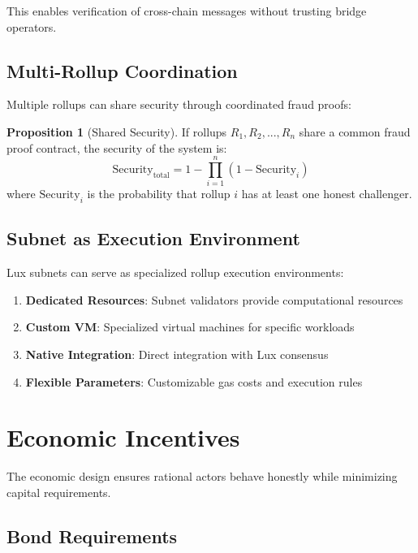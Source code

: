 \documentclass[11pt,a4paper]{article}
\theoremstyle{definition}
\newtheorem{proposition}{Proposition}[section]
\begin{document}
This enables verification of cross-chain messages without trusting bridge operators.

\subsection{Multi-Rollup Coordination}

Multiple rollups can share security through coordinated fraud proofs:

\begin{proposition}[Shared Security]
If rollups $R_1, R_2, ..., R_n$ share a common fraud proof contract, the security of the system is:
\begin{equation}
\text{Security}_{\text{total}} = 1 - \prod_{i=1}^{n}(1 - \text{Security}_i)
\end{equation}
where $\text{Security}_i$ is the probability that rollup $i$ has at least one honest challenger.
\end{proposition}

\subsection{Subnet as Execution Environment}

Lux subnets can serve as specialized rollup execution environments:

\begin{enumerate}
    \item \textbf{Dedicated Resources}: Subnet validators provide computational resources
    \item \textbf{Custom VM}: Specialized virtual machines for specific workloads
    \item \textbf{Native Integration}: Direct integration with Lux consensus
    \item \textbf{Flexible Parameters}: Customizable gas costs and execution rules
\end{enumerate}

\section{Economic Incentives}

The economic design ensures rational actors behave honestly while minimizing capital requirements.

\subsection{Bond Requirements}
\end{document}

